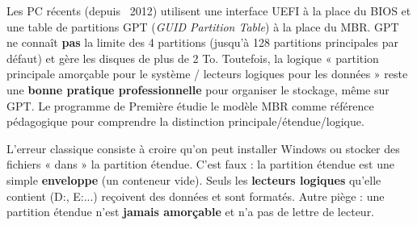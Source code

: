 \documentclass[11pt]{article}
\newcommand{\cle}[1]{{\popxbold\color{popdark}#1}}
\begin{document}
\begin{savaistu}
Les PC récents (depuis ~2012) utilisent une interface \cle{UEFI} à la place du BIOS et une table de partitions \cle{GPT} (\emph{GUID Partition Table}) à la place du MBR. GPT ne connaît \textbf{pas} la limite des 4 partitions (jusqu'à 128 partitions principales par défaut) et gère les disques de plus de 2 To. Toutefois, la logique « partition principale amorçable pour le système / lecteurs logiques pour les données » reste une \textbf{bonne pratique professionnelle} pour organiser le stockage, même sur GPT. Le programme de Première étudie le modèle MBR comme référence pédagogique pour comprendre la distinction principale/étendue/logique.
\end{savaistu}

\begin{attention}
L'erreur classique consiste à croire qu'on peut installer Windows ou stocker des fichiers « dans » la partition étendue. C'est faux : la partition étendue est une simple \textbf{enveloppe} (un conteneur vide). Seuls les \textbf{lecteurs logiques} qu'elle contient (D:, E:...) reçoivent des données et sont formatés. Autre piège : une partition étendue n'est \textbf{jamais amorçable} et n'a pas de lettre de lecteur.
\end{attention}
\end{document}
